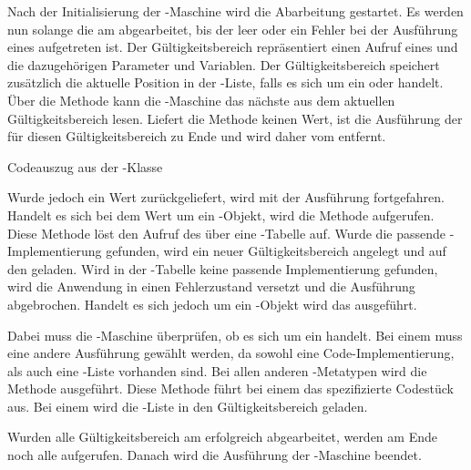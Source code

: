 \SuperPar
Nach der Initialisierung der -Maschine wird die Abarbeitung gestartet. Es werden nun solange die  am  abgearbeitet, bis der  leer oder ein Fehler bei der Ausführung eines  aufgetreten ist. Der Gültigkeitsbereich repräsentiert einen Aufruf eines  und die dazugehörigen Parameter und Variablen. Der Gültigkeitsbereich speichert zusätzlich die aktuelle Position in der -Liste, falls es sich um ein  oder  handelt. Über die Methode  kann die -Maschine das nächste  aus dem aktuellen Gültigkeitsbereich lesen. Liefert die Methode keinen Wert, ist die Ausführung der  für diesen Gültigkeitsbereich zu Ende und wird daher vom  entfernt.

\begin{program}

\caption{Codeauszug aus der -Klasse}
\label{prog:runtime}
\end{program}

\SuperPar
Wurde jedoch ein Wert zurückgeliefert, wird mit der Ausführung fortgefahren. Handelt es sich bei dem Wert um ein -Objekt, wird die Methode  aufgerufen. Diese Methode löst den Aufruf des  über eine -Tabelle auf. Wurde die passende -Implementierung gefunden, wird ein neuer Gültigkeitsbereich angelegt und auf den  geladen. Wird in der -Tabelle keine passende Implementierung gefunden, wird die Anwendung in einen Fehlerzustand versetzt und die Ausführung abgebrochen. Handelt es sich jedoch um ein -Objekt wird das  ausgeführt.  

\SuperPar
Dabei muss die -Maschine überprüfen, ob es sich um ein  handelt. Bei einem  muss eine andere Ausführung gewählt werden, da sowohl eine Code-Implementierung, als auch eine -Liste vorhanden sind. Bei allen anderen -Metatypen wird die Methode  ausgeführt. Diese Methode führt bei einem  das spezifizierte Codestück aus. Bei einem  wird die -Liste in den Gültigkeitsbereich geladen.

\SuperPar
Wurden alle Gültigkeitsbereich am  erfolgreich abgearbeitet, werden am Ende noch alle  aufgerufen. Danach wird die Ausführung der -Maschine beendet.

